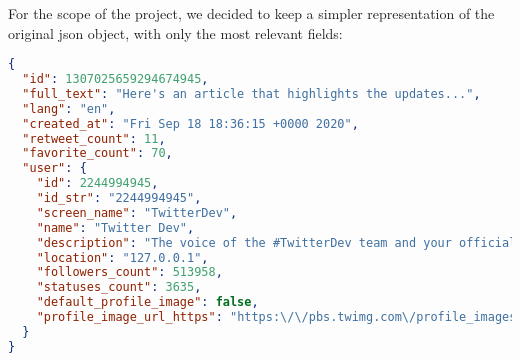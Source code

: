 For the scope of the project, we decided to keep a simpler representation of the original json object, with only the most relevant fields:

\begin{lstlisting}[language=json, caption={Final json object for a Tweet}, captionpos=b, label={lst:tweet_json}]
{
  "id": 1307025659294674945,
  "full_text": "Here's an article that highlights the updates...",
  "lang": "en",
  "created_at": "Fri Sep 18 18:36:15 +0000 2020",
  "retweet_count": 11,
  "favorite_count": 70,
  "user": {
    "id": 2244994945,
    "id_str": "2244994945",
    "screen_name": "TwitterDev",
    "name": "Twitter Dev",
    "description": "The voice of the #TwitterDev team and your official...",
    "location": "127.0.0.1",
    "followers_count": 513958,
    "statuses_count": 3635,
    "default_profile_image": false,
    "profile_image_url_https": "https:\/\/pbs.twimg.com\/profile_images\/1283786620521652229\/lEODkLTh_normal.jpg"
  }
}
\end{lstlisting}



